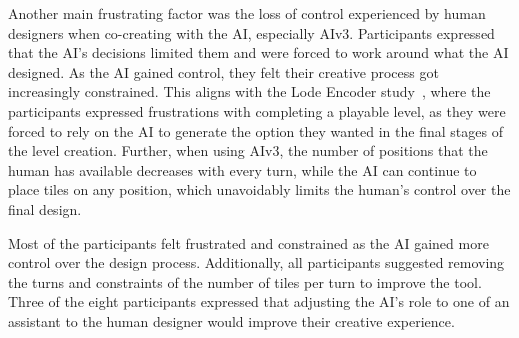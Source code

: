 Another main frustrating factor was the loss of control experienced by human designers when co-creating with the AI, especially AIv3. Participants expressed that the AI's decisions limited them and were forced to work around what the AI designed. As the AI gained control, they felt their creative process got increasingly constrained. This aligns with the Lode Encoder study~\cite{p13bhaumik_lode_2021}, where the participants expressed frustrations with completing a playable level, as they were forced to rely on the AI to generate the option they wanted in the final stages of the level creation. Further, when using AIv3, the number of positions that the human has available decreases with every turn, while the AI can continue to place tiles on any position, which unavoidably limits the human's control over the final design.

Most of the participants felt frustrated and constrained as the AI gained more control over the design process. Additionally, all participants suggested removing the turns and constraints of the number of tiles per turn to improve the tool. Three of the eight participants expressed that adjusting the AI's role to one of an assistant to the human designer would improve their creative experience. 








